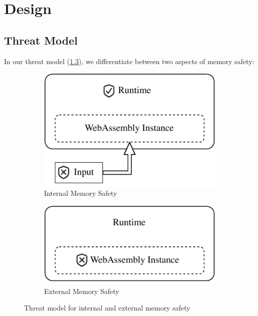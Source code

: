 \chapter{Design}
\label{ch:design}


\section{Threat Model}
\label{sec:threat-model}

In our threat model (\cref{fig:threat-model}), we differentiate between two aspects of memory safety:

\begin{figure}
    \centering
    \begin{subfigure}[T]{0.45\textwidth}
        \centering
        \includegraphics{figures/build/wasm-internal-mem-safety}
        \caption{Internal Memory Safety}
        \label{fig:internal-mem-safety}
    \end{subfigure}
    \hfill
    \begin{subfigure}[T]{0.45\textwidth}
        \centering
        \includegraphics{figures/build/wasm-external-mem-safety}
        \caption{External Memory Safety}
        \label{fig:external-mem-safety}
    \end{subfigure}
    \caption{Threat model for internal and external memory safety}
    \label{fig:threat-model}
\end{figure}

